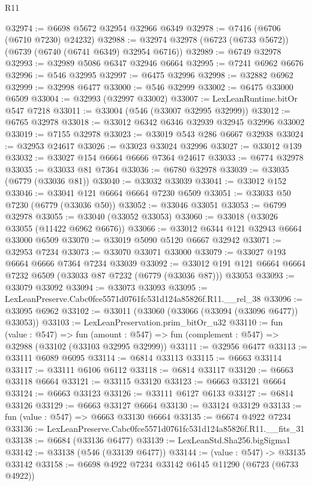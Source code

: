 \begin{lexlean}{R11}
\begin{coremodule}
@32974 := @6698 @5672 @32954 @32966 @6349
@32978 := @7416 (@6706 (@6710 @7230) @24232)
@32988 := @32974 @32978 (@6723 (@6733 @5672)) (@6739 (@6740 (@6741 @6349) @32954 @6716))
@32989 := @6749 @32978
@32993 := @32989 @5086 @6347 @32946 @6664
@32995 := @7241 @6962 @6676
@32996 := @546 @32995
@32997 := @6475 @32996
@32998 := @32882 @6962
@32999 := @32998 @6477
@33000 := @546 @32999
@33002 := @6475 @33000 @6509
@33004 := @32993 (@32997 @33002)
@33007 := LexLeanRuntime.bitOr @547 @7218
@33011 := @33004 (@546 (@33007 @32995 @32999))
@33012 := @6765 @32978
@33018 := @33012 @6342 @6346 @32939 @32945 @32996 @33002
@33019 := @7155 @32978
@33023 := @33019 @543 @286 @6667 @32938
@33024 := @32953 @24617
@33026 := @33023 @33024 @32996
@33027 := @33012 @139
@33032 := @33027 @154 @6664 @6666 @7364 @24617
@33033 := @6774 @32978
@33035 := @33033 @81 @7364
@33036 := @6780 @32978
@33039 := @33035 (@6779 (@33036 @81))
@33040 := @33032 @33039
@33041 := @33012 @152
@33046 := @33041 @121 @6664 @6664 @7230 @6509
@33051 := @33033 @50 @7230 (@6779 (@33036 @50))
@33052 := @33046 @33051
@33053 := @6799 @32978
@33055 := @33040 (@33052 @33053)
@33060 := @33018 (@33026 @33055 (@11422 @6962 @6676))
@33066 := @33012 @6344 @121 @32943 @6664 @33000 @6509
@33070 := @33019 @5090 @5120 @6667 @32942
@33071 := @32953 @7234
@33073 := @33070 @33071 @33000
@33079 := @33027 @193 @6664 @6666 @7364 @7234 @33039
@33092 := @33012 @191 @121 @6664 @6664 @7232 @6509 (@33033 @87 @7232 (@6779 (@33036 @87))) @33053
@33093 := @33079 @33092
@33094 := @33073 @33093
@33095 := LexLeanPreserve.Cabc0fce5571d0761fc531d124a85826f.R11.__rel_38
@33096 := @33095 @6962
@33102 := @33011 (@33060 (@33066 (@33094 (@33096 @6477)) @33053))
@33103 := LexLeanPreservation.prim_bitOr_u32
@33110 := fun (value : @547) =>
  fun (amount : @547) => fun (complement : @547) => @32988 (@33102 (@33103 @32995 @32999))
@33111 := @32956 @6477
@33113 := @33111 @6089 @6095
@33114 := @6814 @33113
@33115 := @6663 @33114
@33117 := @33111 @6106 @6112
@33118 := @6814 @33117
@33120 := @6663 @33118 @6664
@33121 := @33115 @33120
@33123 := @6663 @33121 @6664
@33124 := @6663 @33123
@33126 := @33111 @6127 @6133
@33127 := @6814 @33126
@33129 := @6663 @33127 @6664
@33130 := @33124 @33129
@33133 := fun (value : @547) => @6663 @33130 @6664
@33135 := @6674 @4922 @7234
@33136 := LexLeanPreserve.Cabc0fce5571d0761fc531d124a85826f.R11.__fits_31
@33138 := @6684 (@33136 @6477)
@33139 := LexLeanStd.Sha256.bigSigma1
@33142 := @33138 (@546 (@33139 @6477))
@33144 := (value : @547) -> @33135 @33142
@33158 := @6698
    @4922
    @7234
    @33142
    @6145
    @11290
    (@6723 (@6733 @4922))

\end{coremodule}
\end{lexlean}
